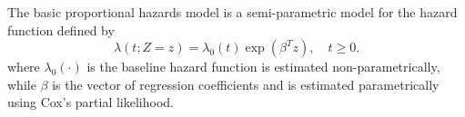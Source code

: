\documentclass[landscape,a0paper,fontscale=0.285]{baposter} %
\begin{document}
\begin{poster}
{The basic proportional hazards model is a semi-parametric model for the hazard
function defined by
\begin{equation}
\lambda\left(t; Z = z\right) = \lambda_0(t) \exp\left(\beta^Tz\right), \quad
t\geq 0.
\end{equation}
where $\lambda_0(\cdot)$ is the baseline hazard function is estimated
non-parametrically, while $\beta$ is the vector of regression coefficients and
is estimated parametrically using Cox's partial likelihood.
}


\end{poster}
\end{document}
